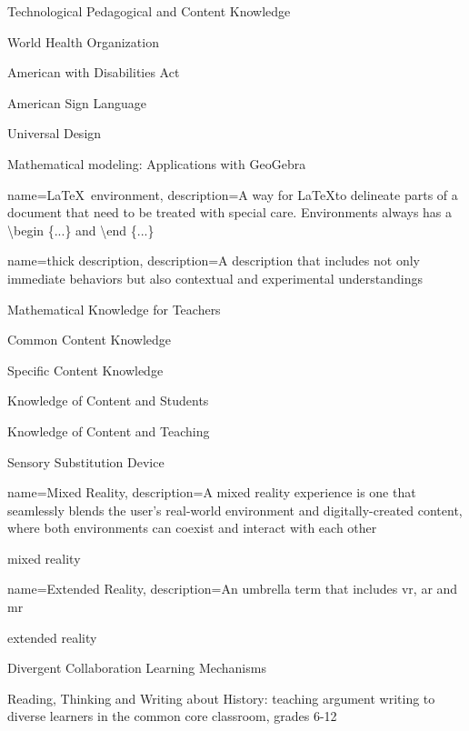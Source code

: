 {Technological Pedagogical and Content Knowledge}

{World Health Organization}

{American with Disabilities Act}

{American Sign Language}

{Universal Design}


{Mathematical modeling: Applications with {G}eo{G}ebra}

{
	name={\LaTeX\ environment},
	description={A way for \LaTeX to delineate parts of a document that need to be treated with special care. Environments always has a \textbackslash begin \{...\} and \textbackslash end \{...\} }
}

{
	name={thick description},
	description={A description that includes not only immediate behaviors but also contextual and experimental understandings}
}


{Mathematical Knowledge for Teachers}

{Common Content Knowledge}

{Specific Content Knowledge}

{Knowledge of Content and Students}

{Knowledge of Content and Teaching}


{Sensory Substitution Device}


{
	name={Mixed Reality},
	description={A mixed reality experience is one that seamlessly blends the user’s real-world environment and digitally-created content, where both environments can coexist and interact with each other \parencite{noauthor_what_2019}}
}

{\gls{mixed reality}}


{
	name={Extended Reality},
	description={An umbrella term that includes \acrlong{vr}, \acrlong{ar} and \acrlong{mr}}
}

{\gls{extended reality}}

{Divergent Collaboration Learning Mechanisms}

{Reading, Thinking and Writing about History: teaching argument writing to diverse learners in the common core classroom, grades 6-12}

